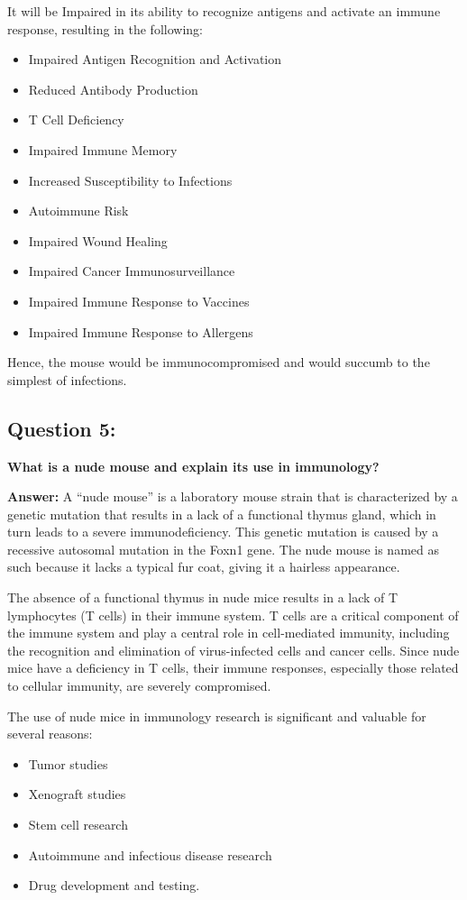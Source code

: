 \documentclass{article}
\begin{document}
  It will be Impaired in its ability to recognize antigens and activate an immune response, resulting in the following:
    \begin{itemize}
      \item  Impaired Antigen Recognition and Activation
      \item Reduced Antibody Production
      \item T Cell Deficiency
      \item Impaired Immune Memory
      \item Increased Susceptibility to Infections
      \item Autoimmune Risk
      \item Impaired Wound Healing
      \item Impaired Cancer Immunosurveillance
      \item Impaired Immune Response to Vaccines
      \item Impaired Immune Response to Allergens
    \end{itemize}
   Hence, the mouse would be immunocompromised and would succumb to the simplest of infections.




\subsection*{Question 5:} \textbf{What is a nude mouse and explain its use in immunology?}

\textbf{Answer:} A ``nude mouse'' is a laboratory mouse strain that is characterized by a genetic mutation that results 
in a lack of a functional thymus gland, which in turn leads to a severe immunodeficiency. This genetic mutation is 
caused by a recessive autosomal mutation in the Foxn1 gene. The nude mouse is named as such because it lacks a typical
 fur coat, giving it a hairless appearance.

The absence of a functional thymus in nude mice results in a lack of T lymphocytes (T cells) in their immune system. 
T cells are a critical component of the immune system and play a central role in cell-mediated immunity, including the 
recognition and elimination of virus-infected cells and cancer cells. Since nude mice have a deficiency in T cells, their 
immune responses, especially those related to cellular immunity, are severely compromised.

The use of nude mice in immunology research is significant and valuable for several reasons:
\begin{itemize}
  \item Tumor studies
  \item Xenograft studies
  \item Stem cell research
  \item Autoimmune and infectious disease research
  \item Drug development and testing.
\end{itemize}
\end{document}

